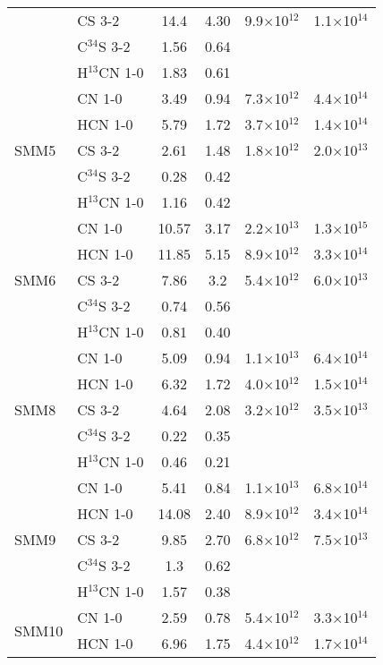 \documentclass{aa}
\begin{document}
\begin{appendix}
\begin{table*}
\begin{tabular}{l l c c c c}
{} & CS 3-2 & 14.4 & 4.30 & 9.9$\times$10$^{12}$ & 1.1$\times$10$^{14}$\\  
{} & C$^{34}$S 3-2 & 1.56 & 0.64 & &\\ 
{} & H$^{13}$CN 1-0 & 1.83 & 0.61 & &\\ 
\hline
\multirow{5}{*}{SMM5} & CN 1-0 & 3.49 & 0.94 & 7.3$\times$10$^{12}$ & 4.4$\times$10$^{14}$\\
{} & HCN 1-0 & 5.79 & 1.72 & 3.7$\times$10$^{12}$ & 1.4$\times$10$^{14}$\\ 
{} & CS 3-2 & 2.61 & 1.48 & 1.8$\times$10$^{12}$ & 2.0$\times$10$^{13}$\\  
{} & C$^{34}$S 3-2 & 0.28 & 0.42  &  & \\ 
{} & H$^{13}$CN 1-0 & 1.16 & 0.42  & & \\ 
\hline
\multirow{5}{*}{SMM6} & CN 1-0 & 10.57 & 3.17 & 2.2$\times$10$^{13}$ & 1.3$\times$10$^{15}$\\
{} & HCN 1-0 & 11.85 & 5.15 & 8.9$\times$10$^{12}$ & 3.3$\times$10$^{14}$\\ 
{} & CS 3-2 & 7.86 & 3.2 & 5.4$\times$10$^{12}$ & 6.0$\times$10$^{13}$\\  
{} & C$^{34}$S 3-2 & 0.74 & 0.56 & & \\ 
{} & H$^{13}$CN 1-0 & 0.81 & 0.40 & & \\
\hline
\multirow{5}{*}{SMM8} & CN 1-0 & 5.09 & 0.94 & 1.1$\times$10$^{13}$ & 6.4$\times$10$^{14}$\\
{} & HCN 1-0 & 6.32 & 1.72 & 4.0$\times$10$^{12}$ & 1.5$\times$10$^{14}$ \\ 
{} & CS 3-2 & 4.64 & 2.08 & 3.2$\times$10$^{12}$ & 3.5$\times$10$^{13}$ \\  
{} & C$^{34}$S 3-2 & 0.22 & 0.35 &  &  \\ 
{} & H$^{13}$CN 1-0 & 0.46 & 0.21 &  & \\
\hline
\multirow{5}{*}{SMM9} & CN 1-0 & 5.41 & 0.84 & 1.1$\times$10$^{13}$ & 6.8$\times$10$^{14}$\\
{} & HCN 1-0 & 14.08 & 2.40 & 8.9$\times$10$^{12}$ & 3.4$\times$10$^{14}$ \\ 
{} & CS 3-2 & 9.85 & 2.70 & 6.8$\times$10$^{12}$ & 7.5$\times$10$^{13}$\\ 
{} & C$^{34}$S 3-2 & 1.3 & 0.62 &  & \\ 
{} & H$^{13}$CN 1-0 & 1.57 & 0.38 & & \\ 
\hline
\multirow{5}{*}{SMM10} & CN 1-0 & 2.59 & 0.78 & 5.4$\times$10$^{12}$ & 3.3$\times$10$^{14}$\\
{} & HCN 1-0 & 6.96 & 1.75 & 4.4$\times$10$^{12}$ & 1.7$\times$10$^{14}$\\ 

\end{tabular}
\end{table*}
\end{appendix}
\end{document}
